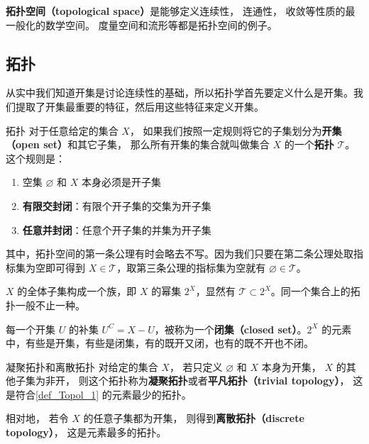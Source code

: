 
\begin{issues}
\issueTODO
\end{issues}



\textbf{拓扑空间（topological space）}是能够定义连续性， 连通性， 收敛等性质的最一般化的数学空间。 度量空间和流形等都是拓扑空间的例子。

\subsection{拓扑}

从实中我们知道开集是讨论连续性的基础，所以拓扑学首先要定义什么是开集。我们提取了开集最重要的特征，然后用这些特征来定义开集。

\begin{definition}{拓扑}\label{def_Topol_1}
对于任意给定的集合 $X$， 如果我们按照一定规则将它的子集划分为\textbf{开集（open set）}和其它子集， 那么所有开集的集合就叫做集合 $X$ 的一个\textbf{拓扑} $\mathcal{T}$。 这个规则是：
\begin{enumerate}
\item 空集 $\varnothing$ 和 $X$ 本身必须是开子集
\item \textbf{有限交封闭}：有限个开子集的交集为开子集
\item \textbf{任意并封闭}：任意个开子集的并集为开子集
\end{enumerate}
\end{definition}

其中，拓扑空间的第一条公理有时会略去不写。因为我们只要在第二条公理处取指标集为空即可得到 $X \in \mathcal{T}$，取第三条公理的指标集为空就有 $\varnothing \in \mathcal{T}$。

$X$ 的全体子集构成一个族，即 $X$ 的幂集 $2^X$，显然有 $\mathcal{T}\subset2^X$。同一个集合上的拓扑一般不止一种。

每一个开集 $U$ 的补集 $U^C=X-U$，被称为一个\textbf{闭集（closed set）}。$2^X$ 的元素中，有些是开集，有些是闭集，有的既开又闭，也有的既不开也不闭。

\begin{example}{凝聚拓扑和离散拓扑}
对给定的集合 $X$， 若只定义 $\varnothing$ 和 $X$ 本身为开集， $X$ 的其他子集为非开， 则这个拓扑称为\textbf{凝聚拓扑}或者\textbf{平凡拓扑（trivial topology）}， 这是符合\autoref{def_Topol_1} 的元素最少的拓扑。

相对地， 若令 $X$ 的任意子集都为开集， 则得到\textbf{离散拓扑（discrete topology）}， 这是元素最多的拓扑。
\end{example}

